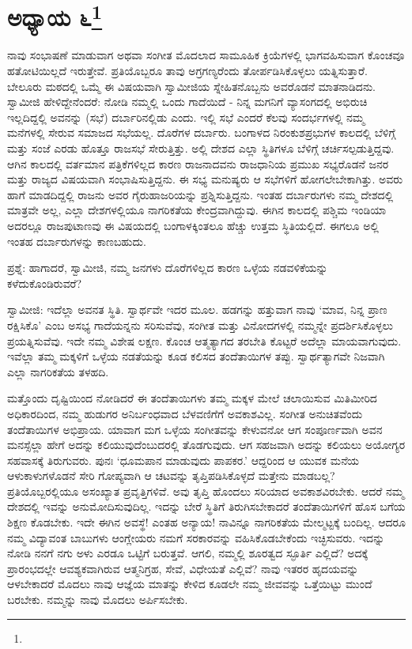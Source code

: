 \newpage

\chapter[ಅಧ್ಯಾಯ ೬]{ಅಧ್ಯಾಯ ೬\protect\footnote{}}

ನಾವು ಸಂಭಾಷಣೆ ಮಾಡುವಾಗ ಅಥವಾ ಸಂಗೀತ ಮೊದಲಾದ ಸಾಮೂಹಿಕ ಕ್ರಿಯೆಗಳಲ್ಲಿ ಭಾಗವಹಿಸುವಾಗ ಕೊಂಚವೂ ಹತೋಟಿಯಿಲ್ಲದೆ ಇರುತ್ತೇವೆ. ಪ್ರತಿಯೊಬ್ಬರೂ ತಾವು ಅಗ್ರಗಣ್ಯರೆಂದು ತೋರ್ಪಡಿಸಿಕೊಳ್ಳಲು ಯತ್ನಿಸುತ್ತಾರೆ. ಬೇಲೂರು ಮಠದಲ್ಲಿ ಒಮ್ಮೆ ಈ ವಿಷಯವಾಗಿ ಸ್ವಾಮೀಜಿಯ ಸ್ನೇಹಿತನೊಬ್ಬನು ಅವರೊಡನೆ ಮಾತನಾಡಿದನು. ಸ್ವಾಮೀಜಿ ಹೇಳಿದ್ದೇನೆಂದರೆ: ನೋಡಿ ನಮ್ಮಲ್ಲಿ ಒಂದು ಗಾದೆಯಿದೆ - ನಿನ್ನ ಮಗನಿಗೆ ವ್ಯಾಸಂಗದಲ್ಲಿ ಅಭಿರುಚಿ ಇಲ್ಲದಿದ್ದಲ್ಲಿ ಅವನನ್ನು (ಸಭೆ) ದರ್ಬಾರಿನಲ್ಲಿಡು ಎಂದು. ಇಲ್ಲಿ ಸಭೆ ಎಂದರೆ ಕೆಲವು ಸಂದರ್ಭಗಳಲ್ಲಿ ನಮ್ಮ ಮನೆಗಳಲ್ಲಿ ಸೇರುವ ಸಮಾಜದ ಸಭೆಯಲ್ಲ. ದೊರೆಗಳ ದರ್ಬಾರು. ಬಂಗಾಳದ ನಿರಂಕುಶಪ್ರಭುಗಳ ಕಾಲದಲ್ಲಿ ಬೆಳಿಗ್ಗೆ ಮತ್ತು ಸಂಜೆ ಎರಡು ಹೊತ್ತೂ ರಾಜಸಭೆ ಸೇರುತ್ತಿತ್ತು. ಅಲ್ಲಿ ದೇಶದ ಎಲ್ಲಾ ಸ್ಥಿತಿಗಳೂ ಬೆಳಿಗ್ಗೆ ಚರ್ಚಿಸಲ್ಪಡುತ್ತಿದ್ದವು. ಆಗಿನ ಕಾಲದಲ್ಲಿ ವರ್ತಮಾನ ಪತ್ರಿಕೆಗಳಿಲ್ಲದ ಕಾರಣ ರಾಜನಾದವನು ರಾಜಧಾನಿಯ ಪ್ರಮುಖ ಸಭ್ಯರೊಡನೆ ಜನರ ಮತ್ತು ರಾಜ್ಯದ ವಿಷಯವಾಗಿ ಸಂಭಾಷಿಸುತ್ತಿದ್ದನು. ಈ ಸಭ್ಯ ಮನುಷ್ಯರು ಆ ಸಭೆಗಳಿಗೆ ಹೋಗಲೇಬೇಕಾಗಿತ್ತು. ಅವರು ಹಾಗೆ ಮಾಡದಿದ್ದಲ್ಲಿ ರಾಜನು ಅವರ ಗೈರುಹಾಜರಿಯನ್ನು ಪ್ರಶ್ನಿಸುತ್ತಿದ್ದನು. ಇಂತಹ ದರ್ಬಾರುಗಳು ನಮ್ಮ ದೇಶದಲ್ಲಿ ಮಾತ್ರವೇ ಅಲ್ಲ, ಎಲ್ಲಾ ದೇಶಗಳಲ್ಲಿಯೂ ನಾಗರಿಕತೆಯ ಕೇಂದ್ರವಾಗಿದ್ದುವು. ಈಗಿನ ಕಾಲದಲ್ಲಿ ಪಶ್ಚಿಮ ಇಂಡಿಯಾ ಅದರಲ್ಲೂ ರಾಜಪುಟಾಣವು ಈ ವಿಷಯದಲ್ಲಿ ಬಂಗಾಳಕ್ಕಿಂತಲೂ ಹೆಚ್ಚು ಉತ್ತಮ ಸ್ಥಿತಿಯಲ್ಲಿದೆ. ಈಗಲೂ ಅಲ್ಲಿ ಇಂತಹ ದರ್ಬಾರುಗಳನ್ನು ಕಾಣಬಹುದು.

ಪ್ರಶ್ನೆ: ಹಾಗಾದರೆ, ಸ್ವಾಮೀಜಿ, ನಮ್ಮ ಜನಗಳು ದೊರೆಗಳಿಲ್ಲದ ಕಾರಣ ಒಳ್ಳೆಯ ನಡವಳಿಕೆಯನ್ನು ಕಳೆದುಕೊಂಡಿರುವರೆ?

ಸ್ವಾಮೀಜಿ: ಇದೆಲ್ಲಾ ಅವನತ ಸ್ಥಿತಿ. ಸ್ವಾರ್ಥವೇ ಇದರ ಮೂಲ. ಹಡಗನ್ನು ಹತ್ತುವಾಗ ನಾವು ‘ಮಾವ, ನಿನ್ನ ಪ್ರಾಣ ರಕ್ಷಿಸಿಕೊ’ ಎಂಬ ಅಸಭ್ಯ ಗಾದೆಯನ್ನನು ಸರಿಸುವೆವು, ಸಂಗೀತ ಮತ್ತು ವಿನೋದಗಳಲ್ಲಿ ನಮ್ಮನ್ನೇ ಪ್ರದರ್ಶಿಸಿಕೊಳ್ಳಲು ಪ್ರಯತ್ನಿಸುವೆವು. ಇದೇ ನಮ್ಮ ವಿಶೇಷ ಲಕ್ಷಣ. ಕೊಂಚ ಆತ್ಮತ್ಯಾಗದ ತರಬೇತಿ ಕೊಟ್ಟರೆ ಅದೆಲ್ಲಾ ಮಾಯವಾಗುವುದು. ಇವೆಲ್ಲಾ ತಮ್ಮ ಮಕ್ಕಳಿಗೆ ಒಳ್ಳೆಯ ನಡತೆಯನ್ನು ಕೂಡ ಕಲಿಸದ ತಂದೆತಾಯಿಗಳ ತಪ್ಪು. ಸ್ವಾರ್ಥತ್ಯಾಗವೇ ನಿಜವಾಗಿ ಎಲ್ಲಾ ನಾಗರಿಕತೆಯ ತಳಹದಿ.

ಮತ್ತೊಂದು ದೃಷ್ಟಿಯಿಂದ ನೋಡಿದರೆ ಈ ತಂದೆತಾಯಿಗಳು ತಮ್ಮ ಮಕ್ಕಳ ಮೇಲೆ ಚಲಾಯಿಸುವ ಮಿತಿಮೀರಿದ ಅಧಿಕಾರದಿಂದ, ನಮ್ಮ ಹುಡುಗರ ಅನಿರ್ಬಂಧವಾದ ಬೆಳವಣಿಗೆಗೆ ಅವಕಾಶವಿಲ್ಲ. ಸಂಗೀತ ಅನುಚಿತವೆಂದು ತಂದೆತಾಯಿಗಳ ಅಭಿಪ್ರಾಯ. ಯಾವಾಗ ಮಗ ಒಳ್ಳೆಯ ಸಂಗೀತವನ್ನು ಕೇಳುವನೋ ಆಗ ಸಂಪೂರ್ಣವಾಗಿ ಅವನ ಮನಸ್ಸೆಲ್ಲಾ ಹೇಗೆ ಅದನ್ನು ಕಲಿಯುವುದೆಂಬುದರಲ್ಲಿ ತೊಡಗುವುದು. ಆಗ ಸಹಜವಾಗಿ ಅದನ್ನು ಕಲಿಯಲು ಅಯೋಗ್ಯರ ಸಹವಾಸಕ್ಕೆ ತಿರುಗುವರು. ಪುನಃ ‘ಧೂಮಪಾನ ಮಾಡುವುದು ಪಾಪಕರ.’ ಆದ್ದರಿಂದ ಆ ಯುವಕ ಮನೆಯ ಆಳುಕಾಳುಗಳೊಡನೆ ಸೇರಿ ಗೋಪ್ಯವಾಗಿ ಆ ಚಟವನ್ನು ತೃಪ್ತಿಪಡಿಸಿಕೊಳ್ಳದೆ ಮತ್ತೇನು ಮಾಡಬಲ್ಲ? ಪ್ರತಿಯೊಬ್ಬರಲ್ಲಿಯೂ ಅಸಂಖ್ಯಾತ ಪ್ರವೃತ್ತಿಗಳಿವೆ. ಅವು ತೃಪ್ತಿ ಹೊಂದಲು ಸರಿಯಾದ ಅವಕಾಶವಿರಬೇಕು. ಆದರೆ ನಮ್ಮ ದೇಶದಲ್ಲಿ ಇವನ್ನು ಅನುಮೋದಿಸುವುದಿಲ್ಲ. ಇದನ್ನು ಬೇರೆ ಸ್ಥಿತಿಗೆ ತಿರುಗಿಸಬೇಕಾದರೆ ತಂದೆತಾಯಿಗಳಿಗೆ ಹೊಸ ಬಗೆಯ ಶಿಕ್ಷಣ ಕೊಡಬೇಕು. ಇದೇ ಈಗಿನ ಅವಸ್ಥೆ! ಎಂತಹ ಅನ್ಯಾಯ! ನಾವಿನ್ನೂ ನಾಗರಿಕತೆಯ ಮೇಲ್ಮಟ್ಟಕ್ಕೆ ಬಂದಿಲ್ಲ. ಆದರೂ ನಮ್ಮ ವಿದ್ಯಾವಂತ ಬಾಬುಗಳು ಆಂಗ್ಲೇಯರು ನಮಗೆ ಸರಕಾರವನ್ನು ವಹಿಸಿಕೊಡಬೇಕೆಂದು ಇಚ್ಛಿಸುವರು. ಇದನ್ನು ನೋಡಿ ನನಗೆ ನಗು ಅಳು ಎರಡೂ ಒಟ್ಟಿಗೆ ಬರುತ್ತವೆ. ಆಗಲಿ, ನಮ್ಮಲ್ಲಿ ಶೂರತ್ವದ ಸ್ಫೂರ್ತಿ ಎಲ್ಲಿದೆ? ಅದಕ್ಕೆ ಪ್ರಾರಂಭದಲ್ಲೇ ಆವಶ್ಯಕವಾಗಿರುವ ಆತ್ಮನಿಗ್ರಹ, ಸೇವೆ, ವಿಧೇಯತೆ ಎಲ್ಲಿವೆ? ನಾವು ಇತರರ ಹೃದಯವನ್ನು ಆಳಬೇಕಾದರೆ ಮೊದಲು ನಾವು ಆಜ್ಞೆಯ ಮಾತನ್ನು ಕೇಳಿದ ಕೂಡಲೇ ನಮ್ಮ ಜೀವವನ್ನು ಒತ್ತೆಯಿಟ್ಟು ಮುಂದೆ ಬರಬೇಕು. ನಮ್ಮನ್ನು ನಾವು ಮೊದಲು ಅರ್ಪಿಸಬೇಕು.

